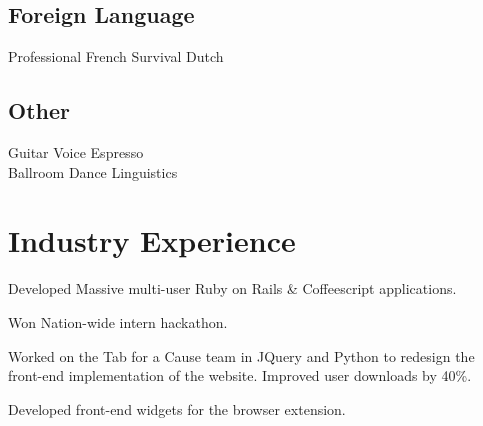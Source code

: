 \documentclass[]{deedy-resume-openfont}
\begin{document}
\begin{minipage}[t]{0.33\textwidth}
\subsection{Foreign Language}
Professional French \textbullet{} Survival Dutch
\sectionsep

\subsection{Other}
Guitar \textbullet{} Voice \textbullet{} Espresso \\
Ballroom Dance \textbullet{} Linguistics


%
%

\end{minipage} 
\hfill
\begin{minipage}[t]{0.66\textwidth} 


\section{Industry Experience}

\vspace{\topsep} %
\begin{tightemize}
  \item Developed Massive multi-user Ruby on Rails \& Coffeescript applications.
  \item Won Nation-wide intern hackathon.
\end{tightemize}
\sectionsep

\begin{tightemize}
\item Worked on the Tab for a Cause team in JQuery and Python to redesign the front-end implementation of the website. Improved user downloads by 40\%.
\item Developed front-end widgets for the browser extension.\end{tightemize}



\end{minipage}
\end{document}
